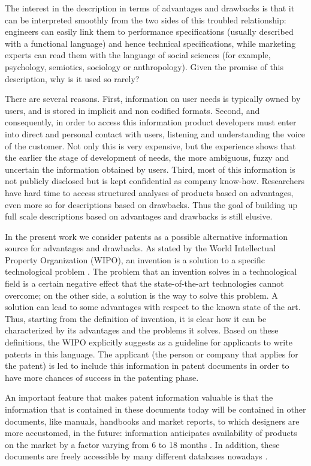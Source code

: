 \documentclass[]{book}
\begin{document}
The interest in the description in terms of advantages and drawbacks is
that it can be interpreted smoothly from the two sides of this troubled
relationship: engineers can easily link them to performance
specifications (usually described with a functional language) and hence
technical specifications, while marketing experts can read them with the
language of social sciences (for example, psychology, semiotics,
sociology or anthropology). Given the promise of this description, why
is it used so rarely?

There are several reasons. First, information on user needs is typically
owned by users, and is stored in implicit and non codified formats.
Second, and consequently, in order to access this information product
developers must enter into direct and personal contact with users,
listening and understanding the voice of the customer. Not only this is
very expensive, but the experience shows that the earlier the stage of
development of needs, the more ambiguous, fuzzy and uncertain the
information obtained by users. Third, most of this information is not
publicly disclosed but is kept confidential as company know-how.
Researchers have hard time to access structured analyses of products
based on advantages, even more so for descriptions based on drawbacks.
Thus the goal of building up full scale descriptions based on advantages
and drawbacks is still elusive.

In the present work we consider patents as a possible alternative
information source for advantages and drawbacks. As stated by the World
Intellectual Property Organization (WIPO), an invention is a solution to
a specific technological problem \citep{world2004wipo}. The problem that
an invention solves in a technological field is a certain negative
effect that the state-of-the-art technologies cannot overcome; on the
other side, a solution is the way to solve this problem. A solution can
lead to some advantages with respect to the known state of the art.
Thus, starting from the definition of invention, it is clear how it can
be characterized by its advantages and the problems it solves. Based on
these definitions, the WIPO explicitly suggests as a guideline for
applicants to write patents in this language. The applicant (the person
or company that applies for the patent) is led to include this
information in patent documents in order to have more chances of success
in the patenting phase.

An important feature that makes patent information valuable is that the
information that is contained in these documents today will be contained
in other documents, like manuals, handbooks and market reports, to which
designers are more accustomed, in the future: information anticipates
availability of products on the market by a factor varying from 6 to 18
months \citep{golzio2012}. In addition, these documents are freely
accessible by many different databases nowadays \citep{kim2015patent}.
\end{document}
